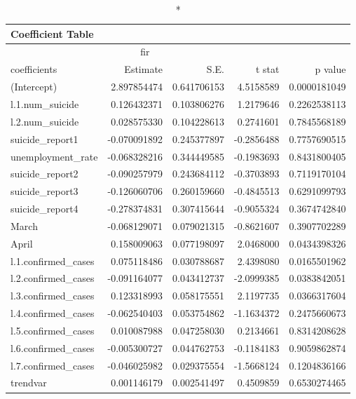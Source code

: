 \begin{longtable}{lrrrr}
\caption*{
{\large Coefficient Table}
} \\ 
\toprule
\multicolumn{4}{c}{fir} &  \\ 
\cmidrule(lr){1-4}
coefficients & Estimate & S.E. & t stat & p value \\ 
\midrule
(Intercept) & 2.897854474 & 0.641706153 & 4.5158589 & 0.0000181049 \\ 
l.1.num\_suicide & 0.126432371 & 0.103806276 & 1.2179646 & 0.2262538113 \\ 
l.2.num\_suicide & 0.028575330 & 0.104228613 & 0.2741601 & 0.7845568189 \\ 
suicide\_report1 & -0.070091892 & 0.245377897 & -0.2856488 & 0.7757690515 \\ 
unemployment\_rate & -0.068328216 & 0.344449585 & -0.1983693 & 0.8431800405 \\ 
suicide\_report2 & -0.090257979 & 0.243684112 & -0.3703893 & 0.7119170104 \\ 
suicide\_report3 & -0.126060706 & 0.260159660 & -0.4845513 & 0.6291099793 \\ 
suicide\_report4 & -0.278374831 & 0.307415644 & -0.9055324 & 0.3674742840 \\ 
March & -0.068129071 & 0.079021315 & -0.8621607 & 0.3907702289 \\ 
April & 0.158009063 & 0.077198097 & 2.0468000 & 0.0434398326 \\ 
l.1.confirmed\_cases & 0.075118486 & 0.030788687 & 2.4398080 & 0.0165501962 \\ 
l.2.confirmed\_cases & -0.091164077 & 0.043412737 & -2.0999385 & 0.0383842051 \\ 
l.3.confirmed\_cases & 0.123318993 & 0.058175551 & 2.1197735 & 0.0366317604 \\ 
l.4.confirmed\_cases & -0.062540403 & 0.053754862 & -1.1634372 & 0.2475660673 \\ 
l.5.confirmed\_cases & 0.010087988 & 0.047258030 & 0.2134661 & 0.8314208628 \\ 
l.6.confirmed\_cases & -0.005300727 & 0.044762753 & -0.1184183 & 0.9059862874 \\ 
l.7.confirmed\_cases & -0.046025982 & 0.029375554 & -1.5668124 & 0.1204836166 \\ 
trendvar & 0.001146179 & 0.002541497 & 0.4509859 & 0.6530274465 \\ 
\bottomrule
\end{longtable}

